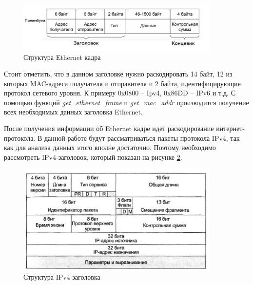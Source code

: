 \documentclass[bachelor, och, coursework]{SCWorks}
\begin{document}
    \begin{figure}[H]
      \centering
      \includegraphics[width=0.9\textwidth]{photo/eth-frame.jpg}
      \caption{Структура Ethernet кадра}
      \label{eth-frame}
    \end{figure}
    
    Стоит отметить, что в данном заголовке нужно раскодировать 14 байт, 12 из которых MAC-адреса получателя и отправителя и 2 байта, идентифицирующие протокол
    сетевого уровня. К примеру 0x0800 -- Ipv4, 0x86DD -- IPv6 и т.д. С помощью функций \textit{get\_ethernet\_frame} и \textit{get\_mac\_addr} производится получение всех необходимых
    данных заголовка Ethernet.
    
      
      

    После получения информации об Ethernet кадре идет раскодирование интернет-протокола. В данной работе будут рассматриваться пакеты протокола IPv4, 
    так как для анализа данных этого вполне достаточно. Поэтому необходимо рассмотреть IPv4-заголовок, который показан на рисунке \ref{ipv4-header}.

    \begin{figure}[H]
      \centering
      \includegraphics[width=0.9\textwidth]{photo/ipv4-header.jpg}
      \caption{Структура IPv4-заголовка}
      \label{ipv4-header}
    \end{figure}
      
\end{document}
